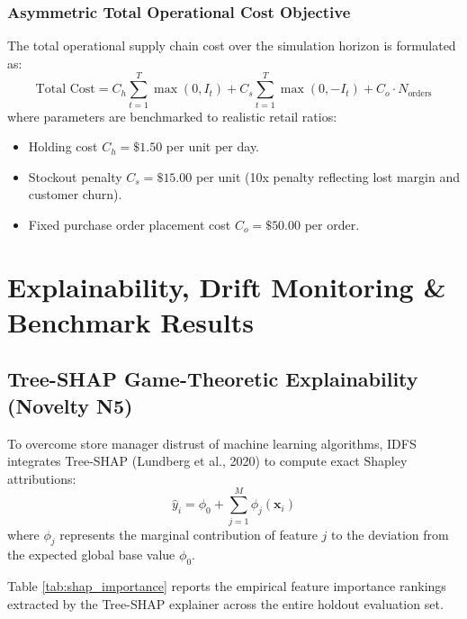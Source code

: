 \documentclass[12pt,a4paper,oneside]{report}
\theoremstyle{definition}
\begin{document}
\subsection{Asymmetric Total Operational Cost Objective}
The total operational supply chain cost over the simulation horizon is formulated as:
\begin{equation}
\text{Total Cost} = C_h \sum_{t=1}^T \max(0, I_t) + C_s \sum_{t=1}^T \max(0, -I_t) + C_o \cdot N_{\text{orders}}
\end{equation}
where parameters are benchmarked to realistic retail ratios:
\begin{itemize}[itemsep=0.1cm]
    \item Holding cost $C_h = \$1.50$ per unit per day.
    \item Stockout penalty $C_s = \$15.00$ per unit (10x penalty reflecting lost margin and customer churn).
    \item Fixed purchase order placement cost $C_o = \$50.00$ per order.
\end{itemize}

\newpage
\chapter{Explainability, Drift Monitoring \& Benchmark Results}

\section{Tree-SHAP Game-Theoretic Explainability (Novelty N5)}
To overcome store manager distrust of machine learning algorithms, IDFS integrates Tree-SHAP (Lundberg et al., 2020) to compute exact Shapley attributions:
\begin{equation}
\hat{y}_i = \phi_0 + \sum_{j=1}^M \phi_j(\mathbf{x}_i)
\end{equation}
where $\phi_j$ represents the marginal contribution of feature $j$ to the deviation from the expected global base value $\phi_0$.

Table \ref{tab:shap_importance} reports the empirical feature importance rankings extracted by the Tree-SHAP explainer across the entire holdout evaluation set.
\end{document}
